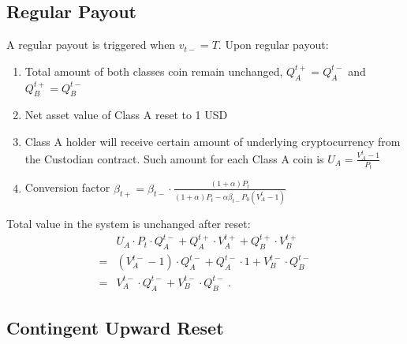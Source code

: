 \documentclass[11pt]{article}%
\numberwithin{equation}{section}
\theoremstyle{plain}
\begin{document}
\begin{appendices}
\subsection{Regular Payout}\label{subsec:Periodic-Reset}

A regular payout is triggered when $v_{t-}=T$. Upon regular payout:
\begin{enumerate}
\item Total amount of both classes coin remain unchanged, $Q_{A}^{t+}=Q_{A}^{t-}$ and $Q_{B}^{t+}=Q_{B}^{t-}$
\item Net asset value of Class A reset to 1 USD
\item Class A holder will receive certain amount of underlying cryptocurrency from the Custodian contract. Such amount for each Class A coin is $U_{A}=\frac{V_{A}^{t}-1}{P_{t}}$
\item Conversion factor $\beta_{t+}=\beta_{t-}\cdot\frac{\left(1+\alpha\right) P_{t}}{\left(1+\alpha\right) P_{t}-\alpha\beta_{t-} P_{0}\left(V_{A}^{t}-1\right)}$
\end{enumerate}
Total value in the system is unchanged after reset:
\begin{align*}
 & U_{A}\cdot P_{t}\cdot Q_{A}^{t-}+Q_{A}^{t+}\cdot V_{A}^{t+}+Q_{B}^{t+}\cdot V_{B}^{t+}\\
= & \left(V_{A}^{t-}-1\right)\cdot Q_{A}^{t-}+Q_{A}^{t-}\cdot1+V_{B}^{t-}\cdot Q_{B}^{t-}\\
= & V_{A}^{t-}\cdot Q_{A}^{t-}+V_{B}^{t-}\cdot Q_{B}^{t-}\ .
\end{align*}



\subsection{Contingent Upward Reset\label{subsec:Contingent-Upward-Reset}}


\end{appendices}
\end{document}
